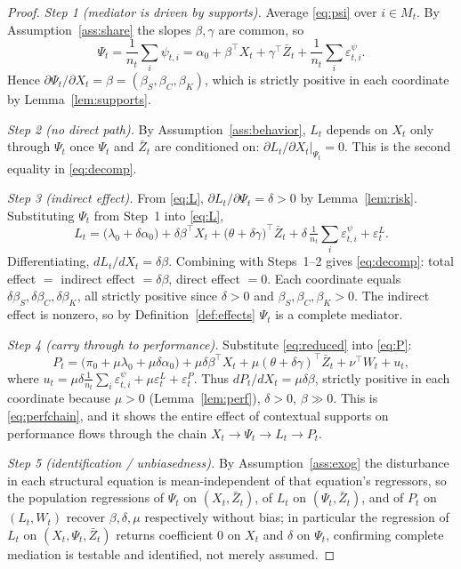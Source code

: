 \documentclass{amsart}
\theoremstyle{definition}
\theoremstyle{remark}
\begin{document}
\begin{proof}
\emph{Step 1 (mediator is driven by supports).}
Average \eqref{eq:psi} over $i\in M_t$. By Assumption~\ref{ass:share} the
slopes $\beta,\gamma$ are common, so
\[
\Psi_t=\frac1{n_t}\sum_i\psi_{t,i}
=\alpha_0+\beta^\top X_t+\gamma^\top \bar Z_t
+\frac1{n_t}\sum_i\varepsilon^\psi_{t,i}.
\]
Hence $\partial\Psi_t/\partial X_t=\beta=(\beta_S,\beta_C,\beta_K)$, which
is strictly positive in each coordinate by Lemma~\ref{lem:supports}.

\emph{Step 2 (no direct path).}
By Assumption~\ref{ass:behavior}, $L_t$ depends on $X_t$ only through
$\Psi_t$ once $\Psi_t$ and $\bar Z_t$ are conditioned on:
$\partial L_t/\partial X_t|_{\Psi_t}=0$. This is the second equality in
\eqref{eq:decomp}.

\emph{Step 3 (indirect effect).}
From \eqref{eq:L}, $\partial L_t/\partial\Psi_t=\delta>0$ by
Lemma~\ref{lem:risk}. Substituting $\Psi_t$ from Step~1 into \eqref{eq:L},
\begin{equation}\label{eq:reduced}
L_t=\big(\lambda_0+\delta\alpha_0\big)
+\delta\beta^\top X_t
+\big(\theta+\delta\gamma\big)^\top\bar Z_t
+\delta\,\tfrac1{n_t}\textstyle\sum_i\varepsilon^\psi_{t,i}
+\varepsilon^L_t .
\end{equation}
Differentiating, $dL_t/dX_t=\delta\beta$. Combining with Steps~1--2 gives
\eqref{eq:decomp}: total effect $=$ indirect effect $=\delta\beta$, direct
effect $=0$. Each coordinate equals $\delta\beta_S,\delta\beta_C,
\delta\beta_K$, all strictly positive since $\delta>0$ and
$\beta_S,\beta_C,\beta_K>0$. The indirect effect is nonzero, so by
Definition~\ref{def:effects} $\Psi_t$ is a complete mediator.

\emph{Step 4 (carry through to performance).}
Substitute \eqref{eq:reduced} into \eqref{eq:P}:
\[
P_t=\big(\pi_0+\mu\lambda_0+\mu\delta\alpha_0\big)
+\mu\delta\beta^\top X_t
+\mu(\theta+\delta\gamma)^\top\bar Z_t
+\nu^\top W_t+ u_t,
\]
where $u_t=\mu\delta\frac1{n_t}\sum_i\varepsilon^\psi_{t,i}+\mu\varepsilon^L_t+\varepsilon^P_t$.
Thus $dP_t/dX_t=\mu\delta\beta$, strictly positive in each coordinate
because $\mu>0$ (Lemma~\ref{lem:perf}), $\delta>0$, $\beta\gg 0$. This is
\eqref{eq:perfchain}, and it shows the entire effect of contextual
supports on performance flows through the chain
$X_t\to\Psi_t\to L_t\to P_t$.

\emph{Step 5 (identification / unbiasedness).}
By Assumption~\ref{ass:exog} the disturbance in each structural equation is
mean-independent of that equation's regressors, so the population
regressions of $\Psi_t$ on $(X_t,\bar Z_t)$, of $L_t$ on
$(\Psi_t,\bar Z_t)$, and of $P_t$ on $(L_t,W_t)$ recover
$\beta,\delta,\mu$ respectively without bias; in particular the regression
of $L_t$ on $(X_t,\Psi_t,\bar Z_t)$ returns coefficient $0$ on $X_t$ and
$\delta$ on $\Psi_t$, confirming complete mediation is testable and
identified, not merely assumed.
\end{proof}
\end{document}
